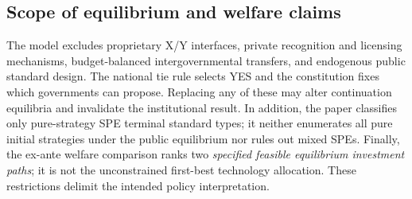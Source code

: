 \subsection{Scope of equilibrium and welfare claims}\label{subsec:limits}

The model excludes proprietary X/Y interfaces,
private recognition and licensing mechanisms,
budget-balanced intergovernmental transfers,
and endogenous public standard design.
The national tie rule selects YES and
the constitution fixes which governments
can propose. Replacing any of these may
alter continuation equilibria and invalidate
the institutional result. In addition,
the paper classifies only pure-strategy
SPE terminal standard types; it neither
enumerates all pure initial strategies
under the public equilibrium nor
rules out mixed SPEs. Finally,
the ex-ante welfare comparison ranks
two \emph{specified feasible equilibrium
investment paths}; it is not the
unconstrained first-best technology
allocation. These restrictions delimit
the intended policy interpretation.
